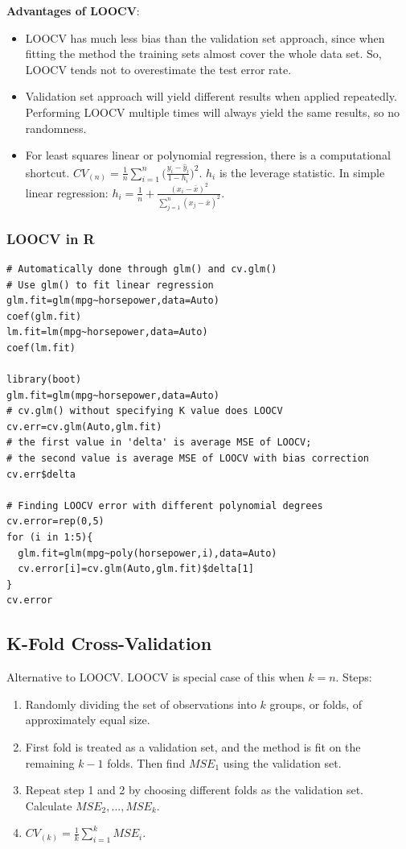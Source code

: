 \documentclass[11pt]{article}
\begin{document}
\noindent \textbf{Advantages of LOOCV}:
\begin{itemize}
    \item LOOCV has much less bias than the validation set approach, since when fitting the method the training sets almost cover the whole data set. So, LOOCV tends not to overestimate the test error rate.
    \item Validation set approach will yield different results when applied repeatedly. Performing LOOCV multiple times will always yield the same results, so no randomness.
    \item For least squares linear or polynomial regression, there is a computational shortcut. $CV_{(n)} = \frac{1}{n}\sum_{i=1}^{n}\Big( \frac{y_i - \hat y_i}{1 - h_i} \Big)^2$. $h_i$ is the leverage statistic. In simple linear regression: $h_i = \frac{1}{n} + \frac{(x_i - \bar x)^2}{\sum_{j=1}^{n}{(x_j - \bar x)^2}}$.
\end{itemize}

\subsubsection{LOOCV in R}
\begin{lstlisting}
# Automatically done through glm() and cv.glm()
# Use glm() to fit linear regression
glm.fit=glm(mpg~horsepower,data=Auto)
coef(glm.fit)
lm.fit=lm(mpg~horsepower,data=Auto)
coef(lm.fit)

library(boot)
glm.fit=glm(mpg~horsepower,data=Auto)
# cv.glm() without specifying K value does LOOCV 
cv.err=cv.glm(Auto,glm.fit)
# the first value in 'delta' is average MSE of LOOCV;
# the second value is average MSE of LOOCV with bias correction
cv.err$delta 

# Finding LOOCV error with different polynomial degrees
cv.error=rep(0,5)
for (i in 1:5){
  glm.fit=glm(mpg~poly(horsepower,i),data=Auto)
  cv.error[i]=cv.glm(Auto,glm.fit)$delta[1]
}
cv.error
\end{lstlisting}

\subsection{K-Fold Cross-Validation}
\noindent Alternative to LOOCV. LOOCV is special case of this when $k=n$. Steps:
\begin{enumerate}
    \item Randomly dividing the set of observations into $k$ groups, or folds, of approximately equal size.
    \item First fold is treated as a validation set, and the method is fit on the remaining $k-1$ folds. Then find $MSE_1$ using the validation set.
    \item Repeat step 1 and 2 by choosing different folds as the validation set. Calculate $MSE_2,...,MSE_k$.
    \item $CV_{(k)} = \frac{1}{k}\sum_{i=1}^{k}{MSE_i}$.
\end{enumerate} \phantom{i}
\end{document}
